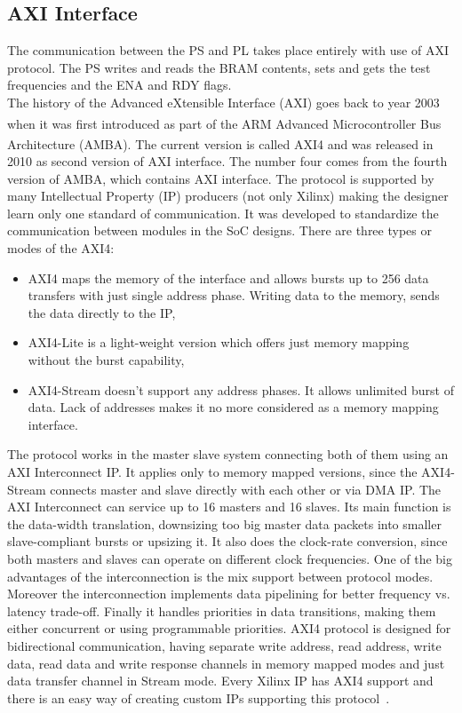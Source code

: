 \subsection{AXI Interface}
The communication between the PS and PL takes place entirely with use of AXI protocol. The PS writes and reads the BRAM contents, sets and gets the test frequencies and the ENA and RDY flags.\\
The history of the Advanced eXtensible Interface (AXI) goes back to year 2003 when it was first introduced as part of the ARM\textsuperscript{\textregistered} Advanced Microcontroller Bus Architecture (AMBA\textsuperscript{\textregistered}). The current version is called AXI4 and was released in 2010 as second version of AXI interface. The number four comes from the fourth version of AMBA, which contains AXI interface. The protocol is supported by many Intellectual Property (IP) producers (not only Xilinx) making the designer learn only one standard of communication. It was developed to standardize the communication between modules in the SoC designs. There are three types or modes of the AXI4:
\begin{itemize}
    \item AXI4 maps the memory of the interface and allows bursts up to 256 data transfers with just single address phase. Writing data to the memory, sends the data directly to the IP,
    \item AXI4-Lite is a light-weight version which offers just memory mapping without the burst capability,
    \item AXI4-Stream doesn't support any address phases. It allows unlimited burst of data. Lack of addresses makes it no more considered as a memory mapping interface.
\end{itemize}
The protocol works in the master slave system connecting both of them using an AXI Interconnect IP. It applies only to memory mapped versions, since the AXI4-Stream connects master and slave directly with each other or via DMA IP. The AXI Interconnect can service up to 16 masters and 16 slaves. Its main function is the data-width translation, downsizing too big master data packets into smaller slave-compliant bursts or upsizing it. It also does the clock-rate conversion, since both masters and slaves can operate on different clock frequencies. One of the big advantages of the interconnection is the mix support between protocol modes. Moreover the interconnection implements data pipelining for better frequency vs. latency trade-off. Finally it handles priorities in data transitions, making them either concurrent or using programmable priorities.
AXI4 protocol is designed for bidirectional communication, having separate write address, read address, write data, read data and write response channels in memory mapped modes and just data transfer channel in Stream mode. Every Xilinx IP has AXI4 support and there is an easy way of creating custom IPs supporting this protocol~\cite{report:AXI}.

